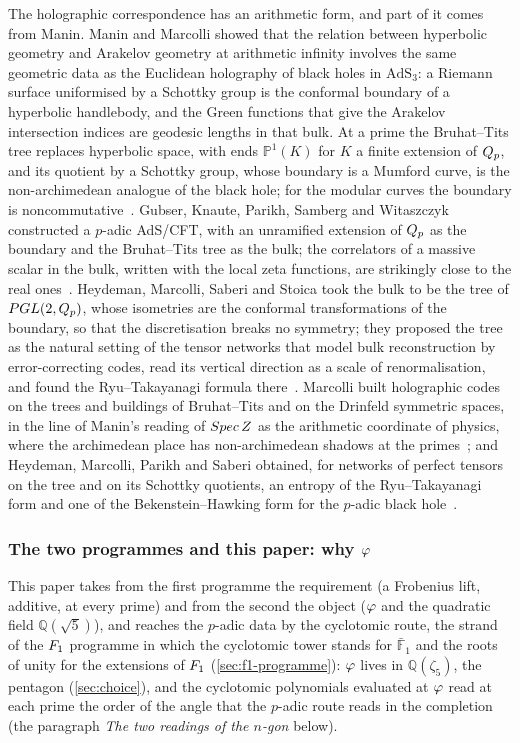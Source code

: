 The holographic correspondence has an arithmetic form, and part of it comes from Manin.  Manin and Marcolli showed that the
relation between hyperbolic geometry and Arakelov geometry at arithmetic infinity involves the same geometric data
as the Euclidean holography of black holes in $\mathrm{AdS}_3$: a Riemann surface uniformised by a Schottky group is
the conformal boundary of a hyperbolic handlebody, and the Green functions that give the Arakelov intersection
indices are geodesic lengths in that bulk.  At a prime the Bruhat--Tits tree replaces hyperbolic space, with ends
$\mathbb P^1(K)$ for $K$ a finite extension of $Q_p$, and its quotient by a Schottky group, whose boundary is a
Mumford curve, is the non-archimedean analogue of the black hole; for the modular curves the boundary is
noncommutative~\cite{maninmarcolli01holo}.  Gubser, Knaute, Parikh, Samberg and Witaszczyk constructed a
$p$-adic AdS/CFT, with an unramified extension of $Q_p$ as the boundary and the Bruhat--Tits tree as the bulk; the
correlators of a massive scalar in the bulk, written with the local zeta functions, are strikingly close to the real
ones~\cite{gubser17padic}.  Heydeman, Marcolli, Saberi and Stoica took the bulk to be the tree of
$PGL(2,Q_p)$, whose isometries are the conformal transformations of the boundary, so that the
discretisation breaks no symmetry; they proposed the tree as the natural setting of the tensor networks that model
bulk reconstruction by error-correcting codes, read its vertical direction as a scale of renormalisation, and found
the Ryu--Takayanagi formula there~\cite{heydeman18tensor}.  Marcolli built holographic codes on the trees and
buildings of Bruhat--Tits and on the Drinfeld symmetric spaces, in the line of Manin's reading of
$Spec\,Z$ as the arithmetic coordinate of physics, where the archimedean place has non-archimedean shadows
at the primes~\cite{marcolli18codes}; and Heydeman, Marcolli, Parikh and Saberi obtained, for networks of perfect
tensors on the tree and on its Schottky quotients, an entropy of the Ryu--Takayanagi form and one of the
Bekenstein--Hawking form for the $p$-adic black hole~\cite{heydeman21entropy}.

\subsubsection{The two programmes and this paper: why $\varphi$}\label{ssec:why-phi}

This paper takes from the first programme the requirement (a Frobenius lift,
additive, at every prime) and from the second the object ($\varphi$ and the
quadratic field $\mathbb{Q}(\sqrt5)$), and reaches the $p$-adic data by the cyclotomic route, the strand of the
$F_1$ programme in which the cyclotomic tower stands for $\bar{\mathbb F}_1$ and the roots of unity for the extensions
of $F_1$ (\cref{sec:f1-programme}):
$\varphi$ lives in $\mathbb{Q}(\zeta_5)$, the pentagon (\cref{sec:choice}),
and the cyclotomic polynomials evaluated at $\varphi$
read at each prime the order of the angle that the
$p$-adic route reads in the completion (the paragraph
\emph{The two readings of the $n$-gon} below).

